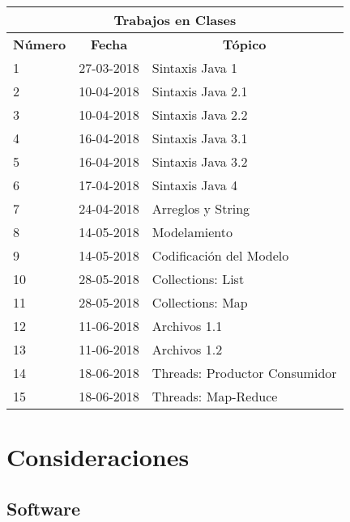 \documentclass{beamer}
\begin{document}
		\begin{frame}
			\begin{table}[!ht]
				 {\scriptsize
					\begin{center}
							 \begin{tabular}{|p{1cm}|p{3cm}|p{5cm}|}\hline
									\multicolumn{3}{|c|}{\textbf{Trabajos en Clases} } \\ \hline
									\multicolumn{1}{|c|}{\textbf{Número}} &
									\multicolumn{1}{|c|}{\textbf{Fecha}} &
									\multicolumn{1}{c|}{\textbf{T\'opico}}  \\ \hline
									  1 & 27-03-2018 & Sintaxis Java 1 \\ \hline
										2 & 10-04-2018 & Sintaxis Java 2.1 \\ \hline
										3 & 10-04-2018 & Sintaxis Java 2.2 \\ \hline
										4 & 16-04-2018 & Sintaxis Java 3.1\\ \hline
										5 & 16-04-2018 & Sintaxis Java 3.2\\ \hline
										6 & 17-04-2018 & Sintaxis Java 4 \\ \hline
										7 & 24-04-2018 & Arreglos y String \\ \hline
										8 & 14-05-2018 & Modelamiento \\ \hline
										9 & 14-05-2018 & Codificaci\'on del Modelo \\ \hline
									 10 & 28-05-2018 & Collections: List \\ \hline
									 11 & 28-05-2018 & Collections: Map \\ \hline
									 12 & 11-06-2018 & Archivos 1.1 \\ \hline
									 13 & 11-06-2018 & Archivos 1.2 \\ \hline
									 14 & 18-06-2018 & Threads: Productor Consumidor \\ \hline
									 15 & 18-06-2018 & Threads: Map-Reduce \\ \hline
							\end{tabular}
					\end{center}}
			 \end{table}
		\end{frame}

	\section{Consideraciones}

		\subsection{Software}
\end{document}
